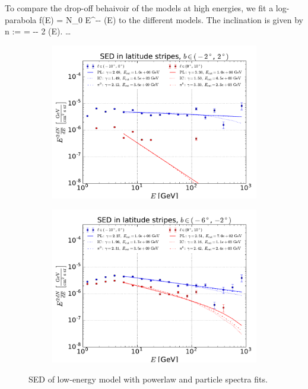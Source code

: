 To compare the drop-off behaivoir of the models at high energies, we fit a log-parabola
 \be
 f(E) = N_0 E^{-\alpha - \beta \ln(E)}
 \ee
 to the different models. The inclination is given by
 \be 
n :=  = -\alpha - 2 \beta \ln(E).
 \ee
 \dots

\begin{figure}[h!]
    \begin{subfigure}{0.5\textwidth}
        \includegraphics[width=\textwidth]{plots/SED_lowE_source_0cutoff.pdf}
    \end{subfigure} 
    \begin{subfigure}{0.5\textwidth}
        \includegraphics[width=\textwidth]{plots/SED_lowE_source_-4cutoff.pdf}
    \end{subfigure}
  	\caption{SED of low-energy model with powerlaw and particle spectra fits.}
  	\label{fig:SED_with_fits}
\end{figure}




